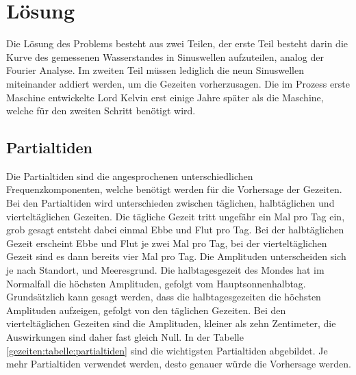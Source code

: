 %
%
%
%
\section{Lösung
	\label{gezeiten:section:Lösung}}
Die Lösung des Problems besteht aus zwei Teilen, der erste Teil besteht darin die Kurve des gemessenen Wasserstandes in Sinuswellen aufzuteilen, analog der Fourier Analyse.
Im zweiten Teil müssen lediglich die neun Sinuswellen miteinander addiert werden, um die Gezeiten vorherzusagen.
Die im Prozess erste Maschine entwickelte Lord Kelvin erst einige Jahre später als die Maschine, welche für den zweiten Schritt benötigt wird.

\subsection{Partialtiden}
Die Partialtiden sind die angesprochenen unterschiedlichen Frequenzkomponenten, welche benötigt werden für die Vorhersage der Gezeiten.
Bei den Partialtiden wird unterschieden zwischen täglichen, halbtäglichen und vierteltäglichen Gezeiten.
Die tägliche Gezeit tritt ungefähr ein Mal pro Tag ein, grob gesagt entsteht dabei einmal Ebbe und Flut pro Tag.
Bei der halbtäglichen Gezeit erscheint Ebbe und Flut je zwei Mal pro Tag, bei der vierteltäglichen Gezeit sind es dann bereits vier Mal pro Tag.
Die Amplituden unterscheiden sich je nach Standort, und Meeresgrund.
Die halbtagesgezeit des Mondes hat im Normalfall die höchsten Amplituden, gefolgt vom Hauptsonnenhalbtag.
Grundsätzlich kann gesagt werden, dass die halbtagesgezeiten die höchsten Amplituden aufzeigen, gefolgt von den täglichen Gezeiten.
Bei den vierteltäglichen Gezeiten sind die Amplituden, kleiner als zehn Zentimeter, die Auswirkungen sind daher fast gleich Null.
In der Tabelle \ref{gezeiten:tabelle:partialtiden} sind die wichtigsten Partialtiden abgebildet.
Je mehr Partialtiden verwendet werden, desto genauer würde die Vorhersage werden. 

